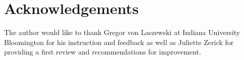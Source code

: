 \documentclass[sigconf]{acmart}
\begin{document}
\section{Acknowledgements}

The author would like to thank Gregor von Laszewski at Indiana University Bloomington for his instruction and feedback as well as Juliette Zerick for providing a first review and recommendations for improvement. 





 
\end{document}
